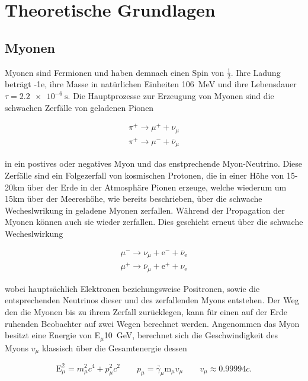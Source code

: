 \section{Theoretische Grundlagen}
    \subsection{Myonen}
        Myonen sind Fermionen und haben demnach einen Spin von $\frac{1}{2}$. Ihre Ladung beträgt -1e, ihre Masse in natürlichen Einheiten \SI{106}{\mega\electronvolt} und ihre Lebensdauer 
        $\tau = \SI{2.2e-6}{\second}$. Die Hauptprozesse zur Erzeugung von Myonen sind die schwachen Zerfälle von geladenen Pionen
        
        \begin{align*}
            \pi^+ \longrightarrow \mu^+ + \nu_{\mu} \\
            \pi^+ \longrightarrow \mu^- + \overline{\nu}_{\mu}
        \end{align*}

        in ein postives oder negatives Myon und das enstprechende Myon-Neutrino. Diese Zerfälle sind ein Folgezerfall von kosmischen Protonen, die in einer Höhe von 15-20km über der Erde in der Atmosphäre
        Pionen erzeuge, welche wiederum um 15km über der Meereshöhe, wie bereits beschrieben, über die schwache Wecheslwrikung in geladene Myonen zerfallen. Während der Propagation der Myonen können auch sie 
        wieder zerfallen. Dies geschieht erneut über die schwache Wecheslwirkung 

        \begin{align*}
            \mu^- \longrightarrow \nu_{\mu} + \text{e}^- + \overline{\nu}_{\text{e}} \\
            \mu^+ \longrightarrow \overline{\nu}_{\mu} + \text{e}^+ + \nu_{\text{e}} 
        \end{align*}

        wobei hauptsächlich Elektronen beziehungsweise Positronen, sowie die entsprechenden Neutrinos dieser und des zerfallenden Myons entstehen. Der Weg den die Myonen bis zu ihrem Zerfall zurücklegen,
        kann für einen auf der Erde ruhenden Beobachter auf zwei Wegen berechnet werden. Angenommen das Myon besitzt eine Energie von E$_{\mu}$\SI{10}{\giga\electronvolt}, berechnet sich die Geschwindigkeit des Myons
        $v_{\mu}$ klassisch über die Gesamtenergie dessen 

        \begin{equation*}
            \text{E}_{\mu}^2 = m_{\mu}^2c^4 + p_{\mu}^2c^2 \qquad \underrightarrow{p_{\mu}=\gamma_{\mu} \text{m}_{\mu}v_{\mu}} \qquad v_{\mu} \approx \num{0.99994}c .
        \end{equation*}

